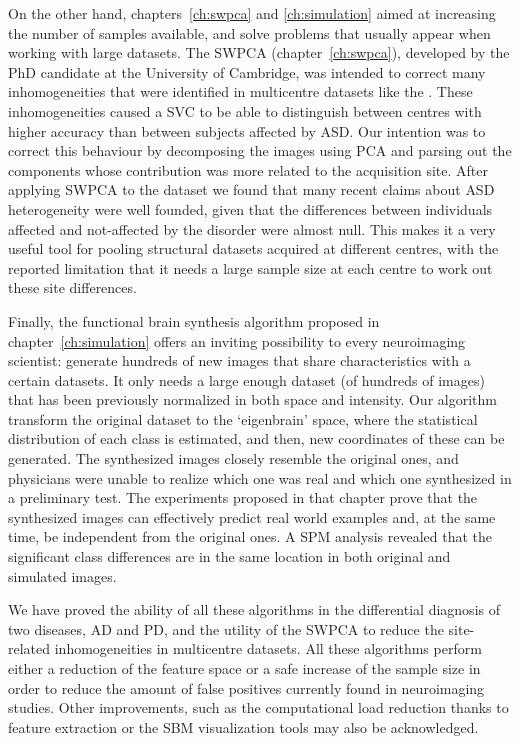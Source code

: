 On the other hand, chapters~\ref{ch:swpca} and \ref{ch:simulation} aimed at increasing the number of samples available, and solve problems that usually appear when working with large datasets. The \ac{SWPCA} (chapter~\ref{ch:swpca}), developed by the PhD candidate at the University of Cambridge, was intended to correct many inhomogeneities that were identified in multicentre datasets like the \aimsmri{}. These inhomogeneities caused a \ac{SVC} to be able to distinguish between centres with higher accuracy than between subjects affected by \ac{ASD}. Our intention was to correct this behaviour by decomposing the images using \ac{PCA} and parsing out the components whose contribution was more related to the acquisition site. After applying \ac{SWPCA} to the dataset we found that many recent claims about \ac{ASD} heterogeneity \cite{haar2014anatomical} were well founded, given that the differences between individuals affected and not-affected by the disorder were almost null. This makes it a very useful tool for pooling structural datasets acquired at different centres, with the reported limitation that it needs a large sample size at each centre to work out these site differences. 

Finally, the functional brain synthesis algorithm proposed in chapter~\ref{ch:simulation} offers an inviting possibility to every neuroimaging scientist: generate hundreds of new images that share characteristics with a certain datasets. It only needs a large enough dataset (of hundreds of images) that has been previously normalized in both space and intensity. Our algorithm transform the original dataset to the `eigenbrain' space, where the statistical distribution of each class is estimated, and then, new coordinates of these can be generated. The synthesized images closely resemble the original ones, and physicians were unable to realize which one was real and which one synthesized in a preliminary test. The experiments proposed in that chapter prove that the synthesized images can effectively predict real world examples and, at the same time, be independent from the original ones. A \ac{SPM} analysis revealed that the significant class differences are in the same location in both original and simulated images. 

We have proved the ability of all these algorithms in the differential diagnosis of two diseases, \ac{AD} and \ac{PD}, and the utility of the \ac{SWPCA} to reduce the site-related inhomogeneities in multicentre datasets. All these algorithms perform either a reduction of the feature space or a safe increase of the sample size in order to reduce the amount of false positives currently found in neuroimaging studies. Other improvements, such as the computational load reduction thanks to feature extraction or the \ac{SBM} visualization tools may also be acknowledged. 


